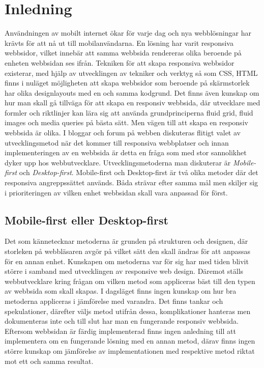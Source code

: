 \documentclass[11pt]{article}
\begin{document}
\section{Inledning}
Användningen av mobilt internet ökar för varje dag och nya webblösningar har krävts för att nå ut till mobilanvändarna. En lösning har varit responsiva webbsidor, vilket innebär att samma webbsida rendereras olika beroende på enheten webbsidan ses ifrån. Tekniken för att skapa responsiva webbsidor existerar, med hjälp av utvecklingen av tekniker och verktyg så som CSS, HTML finns i nuläget möjligheten att skapa webbsidor som beroende på skärmstorlek har olika designlayouts med en och samma kodgrund. Det finns även kunskap om hur man skall gå tillväga för att skapa en responsiv webbsida, där utvecklare med formler och riktlinjer kan lära sig att använda grundprinciperna fluid grid, fluid images och media queries på bästa sätt. Men vägen till att skapa en responsiv webbsida är olika.  I bloggar och forum på webben diskuteras flitigt valet av utvecklingsmetod när det kommer till responsiva webbplatser och innan implementeringen av en webbsida är detta en fråga som med stor sannolikhet dyker upp hos webbutvecklare. Utvecklingsmetoderna man diskuterar är \textit{Mobile-first} och \textit{Desktop-first}. Mobile-first och Desktop-first är två olika metoder där det responsiva angreppssättet används. Båda strävar efter samma mål men skiljer sig i prioriteringen av vilken enhet webbsidan skall vara anpassad för först.

\subsection{Mobile-first eller Desktop-first}
Det som kännetecknar metoderna är  grunden på strukturen och designen,  där storleken på webbläsaren avgör på vilket sätt den  skall ändras för att anpassas för en annan enhet. Kunskapen om metoderna var för sig har med tiden blivit större i samband med utvecklingen av responsive web design. Däremot ställs webbutvecklare kring frågan om vilken metod som appliceras bäst till den typen av webbsida som skall skapas. I dagsläget finns ingen kunskap om hur bra metoderna appliceras i jämförelse med varandra. Det finns tankar och spekulationer, därefter väljs metod utifrån dessa, komplikationer hanteras men dokumenteras inte och till slut har man en fungerande responsiv webbsida. Eftersom webbsidan är färdig implementerad finns ingen anledning till att implementera om en fungerande lösning med en annan metod, därav finns ingen större kunskap om jämförelse av implementationen med respektive metod riktat mot ett och samma resultat.
\end{document}
